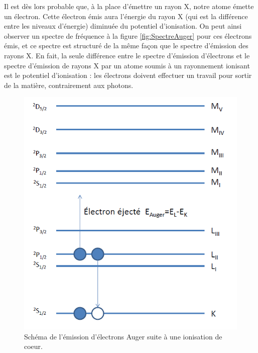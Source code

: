 Il est dès lors probable que, à la place d'émettre un rayon X, notre atome émette un électron. Cette électron émis aura l'énergie du rayon X (qui est la différence entre les niveaux d'énergie) diminuée du potentiel d'ionisation. On peut ainsi observer un spectre de fréquence à la figure \ref{fig:SpectreAuger} pour ces électrons émis, et ce spectre est structuré de la même façon que le spectre d'émission des rayons X. En fait, la seule différence entre le spectre d'émission d'électrons et le spectre d'émission de rayons X par un atome soumis à un rayonnement ionisant est le potentiel d'ionisation : les électrons doivent effectuer un travail pour sortir de la matière, contrairement aux photons.
\begin{figure}[htp]
    \centering
    \includegraphics[scale=0.8]{Images2/Auger.PNG}
    \caption{Schéma de l'émission d'électrons Auger suite à une ionisation de coeur.}
    \label{fig : Auger}
\end{figure}

